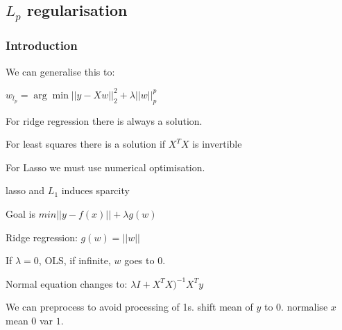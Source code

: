 
\subsection{\(L_p\) regularisation}

\subsubsection{Introduction}

We can generalise this to:

\(w_{l_p} = \arg \min ||y-Xw||^2_2+\lambda ||w||^p_p\)

For ridge regression there is always a solution.

For least squares there is a solution if \(X^TX\) is invertible

For Lasso we must use numerical optimisation.

lasso and \(L_1\) induces sparcity

Goal is \(min ||y - f(x)|| + \lambda g(w)\)

Ridge regression: \(g(w)=||w||\)

If \(\lambda =0\), OLS, if infinite, \(w\) goes to \(0\).

Normal equation changes to: \(\lambda I + X^TX)^{-1}X^Ty\)

We can preprocess to avoid processing of 1s. shift mean of \(y\) to \(0\). normalise \(x\) mean \(0\) var \(1\).



